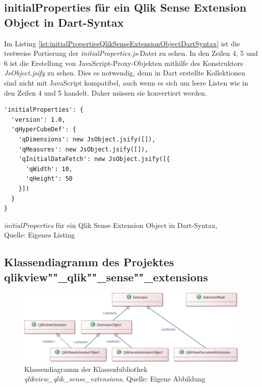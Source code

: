 \begin{appendix}
\newpage
\subsection{initialProperties für ein Qlik Sense Extension Object in Dart-Syntax} 
\label{lab:initialPropertiesQlikSenseExtensionObjectDartSyntax} 

Im Listing \ref{lst:initialPropertiesQlikSenseExtensionObjectDartSyntax} ist die testweise Portierung der \textit{initialProperties.js}-Datei zu sehen. In den Zeilen 4, 5 und 6 ist die Erstellung von JavaScript-Proxy-Objekten mithilfe des Konstruktors \textit{JsObject.jsify} zu sehen. Dies es notwendig, denn in Dart erstellte Kollektionen sind nicht mit JavaScript kompatibel, auch wenn es sich um leere Listen wie in den Zeilen 4 und 5 handelt. Daher müssen sie konvertiert werden.

\begin{listing}[htbp]
\begin{verbatim}
'initialProperties': {
  'version': 1.0,
  'qHyperCubeDef': {
    'qDimensions': new JsObject.jsify([]),
    'qMeasures': new JsObject.jsify([]),
    'qInitialDataFetch': new JsObject.jsify([{
      'qWidth': 10,
      'qHeight': 50
    }])
  }
}
\end{verbatim}
\caption[\textit{initialProperties} für ein Qlik Sense Extension Object in Dart-Syntax]{\textit{initialProperties} für ein Qlik Sense Extension Object in Dart-Syntax, \\Quelle: Eigenes Listing}
\label{lst:initialPropertiesQlikSenseExtensionObjectDartSyntax}
\end{listing}


\newpage
\subsection{Klassendiagramm des Projektes qlikview""\_qlik""\_sense""\_extensions} 
\label{lab:KlassendiagrammDerKlassenbibliothek} 

\begin{figure}[htbp]
	\centering
		\includegraphics[width=1.00\textwidth]{img/Klassendiagramm/Klassendiagramm.png}
	\caption[Klassendiagramm der Klassenbibliothek \textit{qlikview\_qlik\_sense\_extensions}]{Klassendiagramm der Klassenbibliothek \textit{qlikview\_qlik\_sense\_extensions}, Quelle: Eigene Abbildung}
	\label{fig:Klassendiagramm}
\end{figure}



\end{appendix}
